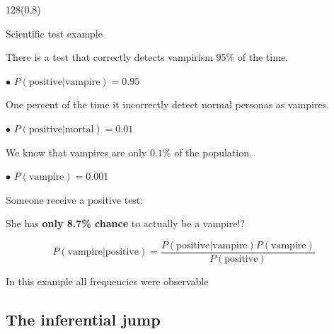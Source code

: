 \documentclass[shownotes]{beamer}
\begin{document}
\begin{frame}
\begin{textblock}{128}(0,8)
\begin{center}
 \large Scientific test example
\end{center}
\end{textblock}
\vspace{0.5cm}


{ \footnotesize
 There is a test that correctly detects vampirism $95\%$ of the time.
 
 $\bullet$ $P(\text{positive}|\text{vampire})=0.95$
 
 \pause \medskip 

 One percent of the time it incorrectly detect normal personas as vampires.
 
 $\bullet$ $P(\text{positive}|\text{mortal})=0.01$
 
 \pause \medskip 
 
 We know that vampires are only $0.1\%$ of the population. 
 
 $\bullet$ $P(\text{vampire})=0.001$

}

\pause

\begin{center}
 Someone receive a positive test: 
 
 \pause
 She has \textbf{only 8.7\% chance} to actually be a vampire!?
\end{center}

\begin{equation*}
 P(\text{vampire}|\text{positive}) = \frac{P(\text{positive}|\text{vampire})P(\text{vampire})}{P(\text{positive})}
\end{equation*}

\pause


\begin{mdframed}[backgroundcolor=black!15]
 \centering \normalsize
 In this example all frequencies were observable
\end{mdframed}

\end{frame}

\subsection{The inferential jump}
\end{document}
